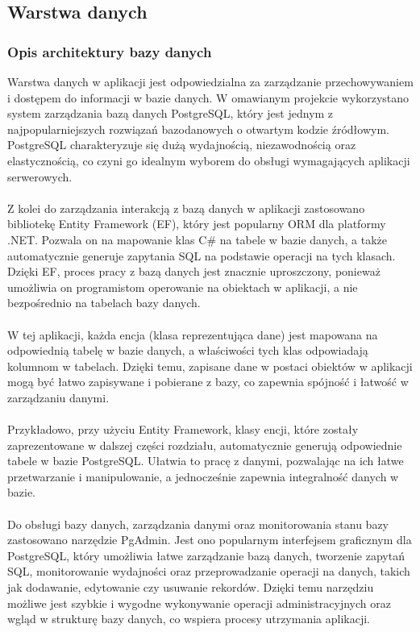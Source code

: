 \documentclass[12pt,a4paper]{article}
\begin{document}
\newpage

\subsection{Warstwa danych}

\subsubsection{Opis architektury bazy danych}

\noindent
Warstwa danych w aplikacji jest odpowiedzialna za zarządzanie przechowywaniem i dostępem do informacji w bazie danych. W omawianym projekcie wykorzystano system zarządzania bazą danych PostgreSQL, który jest jednym z najpopularniejszych rozwiązań bazodanowych o otwartym kodzie źródłowym. PostgreSQL charakteryzuje się dużą wydajnością, niezawodnością oraz elastycznością, co czyni go idealnym wyborem do obsługi wymagających aplikacji serwerowych.
\\\\
Z kolei do zarządzania interakcją z bazą danych w aplikacji zastosowano bibliotekę Entity Framework (EF), który jest popularny ORM dla platformy .NET. Pozwala on na mapowanie klas C\# na tabele w bazie danych, a także automatycznie generuje zapytania SQL na podstawie operacji na tych klasach. Dzięki EF, proces pracy z bazą danych jest znacznie uproszczony, ponieważ umożliwia on programistom operowanie na obiektach w aplikacji, a nie bezpośrednio na tabelach bazy danych.
\\\\
W tej aplikacji, każda encja (klasa reprezentująca dane) jest mapowana na odpowiednią tabelę w bazie danych, a właściwości tych klas odpowiadają kolumnom w tabelach. Dzięki temu, zapisane dane w postaci obiektów w aplikacji mogą być łatwo zapisywane i pobierane z bazy, co zapewnia spójność i łatwość w zarządzaniu danymi.
\\\\
Przykładowo, przy użyciu Entity Framework, klasy encji, które zostały zaprezentowane w dalszej części rozdziału, automatycznie generują odpowiednie tabele w bazie PostgreSQL. Ułatwia to pracę z danymi, pozwalając na ich łatwe przetwarzanie i manipulowanie, a jednocześnie zapewnia integralność danych w bazie.
\\\\
Do obsługi bazy danych, zarządzania danymi oraz monitorowania stanu bazy zastosowano narzędzie PgAdmin. Jest ono popularnym interfejsem graficznym dla PostgreSQL, który umożliwia łatwe zarządzanie bazą danych, tworzenie zapytań SQL, monitorowanie wydajności oraz przeprowadzanie operacji na danych, takich jak dodawanie, edytowanie czy usuwanie rekordów. Dzięki temu narzędziu możliwe jest szybkie i wygodne wykonywanie operacji administracyjnych oraz wgląd w strukturę bazy danych, co wspiera procesy utrzymania aplikacji.
\end{document}
